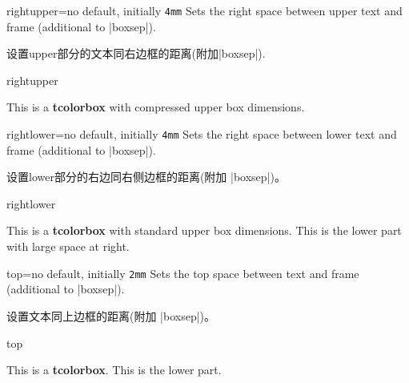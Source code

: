 \begin{docTcbKey}{rightupper}{=}{no default, initially \texttt{4mm}}
  Sets the right space between upper text and frame (additional to |boxsep|).

设置upper部分的文本同右边框的距离(附加|boxsep|).
\begin{exdispExample}{rightupper}

\begin{tcolorbox}[width=5cm,rightupper=2cm,title=My very long title text]
This is a \textbf{tcolorbox} with compressed upper box dimensions.
\end{tcolorbox}
\end{exdispExample}
\end{docTcbKey}





\begin{docTcbKey}{rightlower}{=}{no default, initially \texttt{4mm}}
  Sets the right space between lower text and frame (additional to |boxsep|).

设置lower部分的右边同右侧边框的距离(附加 |boxsep|)。
\begin{exdispExample}{rightlower}

\begin{tcolorbox}[width=5cm,rightlower=2cm]
This is a \textbf{tcolorbox} with standard upper box dimensions.
\tcblower
This is the lower part with large space at right.
\end{tcolorbox}
\end{exdispExample}
\end{docTcbKey}



\begin{docTcbKey}{top}{=}{no default, initially \texttt{2mm}}
  Sets the top space between text and frame (additional to |boxsep|).

设置文本同上边框的距离(附加 |boxsep|)。
\begin{exdispExample}{top}

\begin{tcolorbox}[top=0mm]
This is a \textbf{tcolorbox}.
\tcblower
This is the lower part.
\end{tcolorbox}
\end{exdispExample}
\end{docTcbKey}


